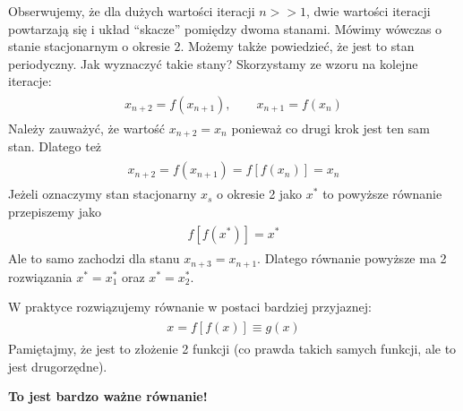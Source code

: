 \documentclass[a4paper,12pt,polish]{sphinxmanual}
\begin{document}
Obserwujemy, że dla dużych wartości iteracji $n>>1$, dwie wartości iteracji powtarzają się i układ ``skacze'' pomiędzy dwoma stanami. Mówimy wówczas o stanie stacjonarnym o okresie 2. Możemy także powiedzieć, że jest to stan periodyczny. Jak wyznaczyć takie stany?  Skorzystamy ze wzoru na kolejne iteracje:
\label{ch1/chI031:equation-eqn26}\begin{gather}
\begin{split}x_{n+2} = f(x_{n+1}), \qquad x_{n+1} = f(x_{n})\end{split}\label{ch1/chI031-eqn26}
\end{gather}
Należy zauważyć, że wartość $x_{n+2} = x_n$ ponieważ co drugi krok jest ten sam stan. Dlatego też
\label{ch1/chI031:equation-eqn27}\begin{gather}
\begin{split}x_{n+2} = f(x_{n+1}) = f[f(x_{n})] = x_n\end{split}\label{ch1/chI031-eqn27}
\end{gather}
Jeżeli oznaczymy stan stacjonarny $x_s$ o okresie 2 jako $x^*$ to powyższe równanie przepiszemy jako
\label{ch1/chI031:equation-eqn28}\begin{gather}
\begin{split}f[f(x^*)] = x^*\end{split}\label{ch1/chI031-eqn28}
\end{gather}
Ale to samo zachodzi dla stanu $x_{n+3} = x_{n+1}$. Dlatego równanie powyższe ma 2 rozwiązania $x^* = x^*_1$  oraz  $x^* = x^*_2$.

W praktyce rozwiązujemy równanie w postaci bardziej przyjaznej:
\label{ch1/chI031:equation-eqn29}\begin{gather}
\begin{split}x = f[f(x)] \equiv g(x)\end{split}\label{ch1/chI031-eqn29}
\end{gather}
Pamiętajmy, że jest to złożenie 2 funkcji (co prawda takich samych funkcji, ale to jest drugorzędne).

\textbf{To jest bardzo ważne równanie!}
\end{document}
